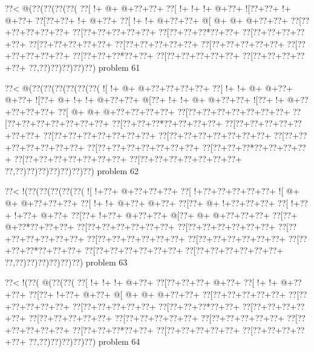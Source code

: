 \vbox{\vbox{\goo
\0??<\- @(\0??(\0??(\0??(\0??(
\0??[\- !+\- @+\- @+\0??+\0??+
\0??[\- !+\- !+\- !+\- @+\0??+
\- ![\0??+\0??+\- !+\- @+\0??+
\0??[\0??+\0??+\- !+\- @+\0??+
\0??[\- !+\- !+\- @+\0??+\0??+
\- @[\- @+\- @+\- @+\0??+\0??+
\0??[\0??+\0??+\0??+\0??+\0??+
\0??[\0??+\0??+\0??+\0??+\0??+
\0??[\0??+\0??+\0??*\0??+\0??+
\0??[\0??+\0??+\0??+\0??+\0??+
\0??[\0??+\0??+\0??+\0??+\0??+
\0??[\0??+\0??+\0??+\0??+\0??+
\0??[\0??+\0??+\0??+\0??+\0??+
\0??[\0??+\0??+\0??+\0??+\0??+
\0??[\0??+\0??+\0??*\0??+\0??+
\0??[\0??+\0??+\0??+\0??+\0??+
\0??[\0??+\0??+\0??+\0??+\0??+
\0??,\0??)\0??)\0??)\0??)\0??)
}
\hfil problem 61\hfil\break
}

\vbox{\vbox{\goo
\0??<\- @(\0??(\0??(\0??(\0??(\0??(\0??(
\- ![\- !+\- @+\- @+\0??+\0??+\0??+\0??+
\0??[\- !+\- !+\- @+\- @+\0??+\- @+\0??+
\- ![\0??+\- @+\- !+\- !+\- @+\0??+\0??+
\- @[\0??+\- !+\- !+\- @+\- @+\0??+\0??+
\- ![\0??+\- !+\- @+\0??+\0??+\0??+\0??+
\0??[\- @+\- @+\- @+\0??+\0??+\0??+\0??+
\0??[\0??+\0??+\0??+\0??+\0??+\0??+\0??+
\0??[\0??+\0??+\0??+\0??+\0??+\0??+\0??+
\0??[\0??+\0??+\0??*\0??+\0??+\0??+\0??+
\0??[\0??+\0??+\0??+\0??+\0??+\0??+\0??+
\0??[\0??+\0??+\0??+\0??+\0??+\0??+\0??+
\0??[\0??+\0??+\0??+\0??+\0??+\0??+\0??+
\0??[\0??+\0??+\0??+\0??+\0??+\0??+\0??+
\0??[\0??+\0??+\0??+\0??+\0??+\0??+\0??+
\0??[\0??+\0??+\0??*\0??+\0??+\0??+\0??+
\0??[\0??+\0??+\0??+\0??+\0??+\0??+\0??+
\0??[\0??+\0??+\0??+\0??+\0??+\0??+\0??+
\0??,\0??)\0??)\0??)\0??)\0??)\0??)\0??)
}
\hfil problem 62\hfil\break
}

\vbox{\vbox{\goo
\0??<\- !(\0??(\0??(\0??(\0??(\0??(
\- ![\- !+\0??+\- @+\0??+\0??+\0??+
\0??[\- !+\0??+\0??+\0??+\0??+\0??+
\- ![\- @+\- @+\- @+\0??+\0??+\0??+
\0??[\- !+\- !+\- @+\0??+\- @+\0??+
\0??[\0??+\- @+\- !+\0??+\0??+\0??+
\0??[\- !+\0??+\- !+\0??+\- @+\0??+
\0??[\0??+\- !+\0??+\- @+\0??+\0??+
\- @[\0??+\- @+\- @+\0??+\0??+\0??+
\0??[\0??+\- @+\0??*\0??+\0??+\0??+
\0??[\0??+\0??+\0??+\0??+\0??+\0??+
\0??[\0??+\0??+\0??+\0??+\0??+\0??+
\0??[\0??+\0??+\0??+\0??+\0??+\0??+
\0??[\0??+\0??+\0??+\0??+\0??+\0??+
\0??[\0??+\0??+\0??+\0??+\0??+\0??+
\0??[\0??+\0??+\0??*\0??+\0??+\0??+
\0??[\0??+\0??+\0??+\0??+\0??+\0??+
\0??[\0??+\0??+\0??+\0??+\0??+\0??+
\0??,\0??)\0??)\0??)\0??)\0??)\0??)
}
\hfil problem 63\hfil\break
}

\vbox{\vbox{\goo
\0??<\- !(\0??(\- @(\0??(\0??(
\0??[\- !+\- !+\- !+\- @+\0??+
\0??[\0??+\0??+\0??+\- @+\0??+
\0??[\- !+\- !+\- @+\0??+\0??+
\0??[\0??+\- !+\0??+\- @+\0??+
\- @[\- @+\- @+\- @+\0??+\0??+
\0??[\0??+\0??+\0??+\0??+\0??+
\0??[\0??+\0??+\0??+\0??+\0??+
\0??[\0??+\0??+\0??+\0??+\0??+
\0??[\0??+\0??+\0??*\0??+\0??+
\0??[\0??+\0??+\0??+\0??+\0??+
\0??[\0??+\0??+\0??+\0??+\0??+
\0??[\0??+\0??+\0??+\0??+\0??+
\0??[\0??+\0??+\0??+\0??+\0??+
\0??[\0??+\0??+\0??+\0??+\0??+
\0??[\0??+\0??+\0??*\0??+\0??+
\0??[\0??+\0??+\0??+\0??+\0??+
\0??[\0??+\0??+\0??+\0??+\0??+
\0??,\0??)\0??)\0??)\0??)\0??)
}
\hfil problem 64\hfil\break
}

